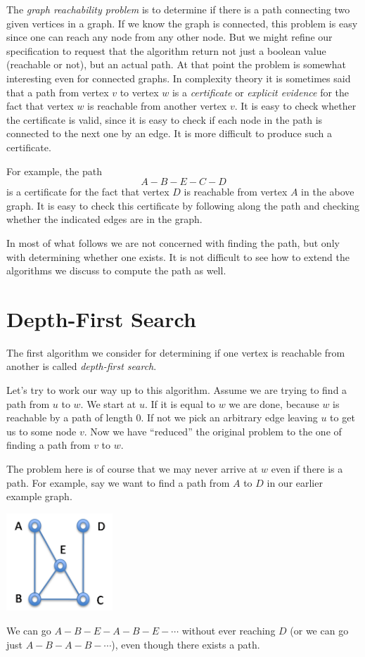 The \emph{graph reachability problem} is to determine if there is a
path connecting two given vertices in a graph.  If we know the graph
is connected, this problem is easy since one can reach any node from
any other node.  But we might refine our specification to request that
the algorithm return not just a boolean value (reachable or not), but
an actual path.  At that point the problem is somewhat interesting
even for connected graphs. In complexity theory it is sometimes said
that a path from vertex $v$ to vertex $w$ is a \emph{certificate} or
\emph{explicit evidence} for the fact that vertex $w$ is reachable
from another vertex $v$.  It is easy to check whether the certificate
is valid, since it is easy to check if each node in the path is
connected to the next one by an edge.  It is more difficult to produce
such a certificate.

For example, the path
$$
A-B-E-C-D
$$
is a certificate for the fact that vertex $D$ is reachable from vertex
$A$ in the above graph.  It is easy to check this certificate by
following along the path and checking whether the indicated edges are
in the graph.

In most of what follows we are not concerned with finding the path,
but only with determining whether one exists. It is not difficult to
see how to extend the algorithms we discuss to compute the path as
well.


\section{Depth-First Search}
\label{sec:graphsearch:dfs}

The first algorithm we consider for determining if one vertex is
reachable from another is called \emph{depth-first search}.

Let's try to work our way up to this algorithm.  Assume we are trying
to find a path from $u$ to $w$.  We start at $u$.  If it is equal to
$w$ we are done, because $w$ is reachable by a path of length 0.  If
not we pick an arbitrary edge leaving $u$ to get us to some node $v$.
Now we have ``reduced'' the original problem to the one of finding a
path from $v$ to $w$.

The problem here is of course that we may never arrive at $w$ even if
there is a path.  For example, say we want to find a path from $A$ to
$D$ in our earlier example graph.
\begin{center}
  \includegraphics[width=0.3\textwidth]{img/graph0.png}
\end{center}
We can go $A-B-E-A-B-E-\cdots$ without ever reaching $D$ (or we can go
just $A-B-A-B-\cdots$), even though there exists a path.

